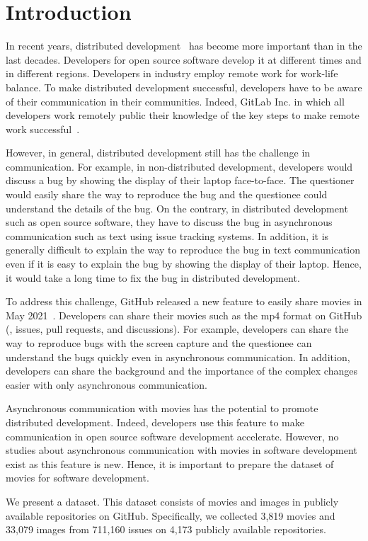 \section{Introduction}
\label{sec:intro}
In recent years, distributed development~\citep{sengupta2006ICSE} 
has become more important than in the last decades. 
Developers for open source software develop it 
at different times and in different regions. 
Developers in industry employ remote work for work-life balance. 
To make distributed development successful, 
developers have to be aware of their communication 
in their communities. 
Indeed, GitLab Inc. in which all developers work remotely 
public their knowledge of the key steps 
to make remote work successful~\citep{gitlab2020remoteplaybook}. 


However, in general, distributed development still has 
the challenge in communication. 
For example, in non-distributed development, 
developers would discuss a bug by showing the display of 
their laptop face-to-face. 
The questioner would easily share the way to reproduce the bug 
and the questionee could understand the details of the bug. 
On the contrary, in distributed development such as 
open source software, they have to discuss the bug 
in asynchronous communication 
such as text using issue tracking systems. 
In addition, it is generally difficult to explain the way 
to reproduce the bug in text communication 
even if it is easy to explain the bug by showing 
the display of their laptop. 
Hence, it would take a long time to fix the bug 
in distributed development. 


To address this challenge, GitHub released a new feature 
to easily share movies in May 2021~\citep{github-video-blog}. 
Developers can share their movies such as the mp4 format 
on GitHub (\eg,  issues, pull requests, and discussions). 
For example, developers can share the way to reproduce bugs 
with the screen capture and the questionee can understand 
the bugs quickly even in asynchronous communication. 
In addition, developers can share the background and 
the importance of the complex changes easier with 
only asynchronous communication. 


Asynchronous communication with movies has the potential 
to promote distributed development. 
Indeed, developers use this feature to make communication 
in open source software development accelerate. 
However, no studies about asynchronous communication with 
movies in software development exist 
as this feature is new. 
Hence, it is important to prepare the dataset of movies
for software development. 


We present a dataset. 
This dataset consists of movies and images 
in publicly available repositories on GitHub. 
Specifically, we collected 
3,819 movies and 
33,079 images from 
711,160 issues on
4,173 publicly available repositories.
